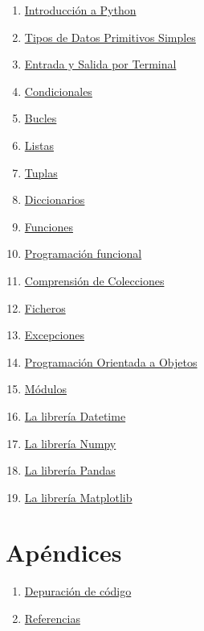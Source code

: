 \documentclass[
  spanish,
  a4paper,
]{scrreport}
\providecommand{\tightlist}{%
  \setlength{\itemsep}{0pt}\setlength{\parskip}{0pt}}
\begin{document}

\begin{enumerate}
\def\labelenumi{\arabic{enumi}.}
\tightlist
\item
  \href{01-introduccion-python.qmd}{Introducción a Python}
\item
  \href{02-tipos-datos-simples.qmd}{Tipos de Datos Primitivos Simples}
\item
  \href{03-entrada-salida.qmd}{Entrada y Salida por Terminal}
\item
  \href{04-condicionales.qmd}{Condicionales}
\item
  \href{05-bucles.qmd}{Bucles}
\item
  \href{06-listas.qmd}{Listas}
\item
  \href{07-tuplas.qmd}{Tuplas}
\item
  \href{08-diccionarios.qmd}{Diccionarios}
\item
  \href{09-funciones.qmd}{Funciones}
\item
  \href{10-programacion-funcional.qmd}{Programación funcional}
\item
  \href{11-comprension-colecciones.qmd}{Comprensión de Colecciones}
\item
  \href{12-ficheros.qmd}{Ficheros}
\item
  \href{13-excepciones.qmd}{Excepciones}
\item
  \href{14-objetos.qmd}{Programación Orientada a Objetos}
\item
  \href{15-modulos.qmd}{Módulos}
\item
  \href{16-datetime.qmd}{La librería Datetime}
\item
  \href{17-numpy.qmd}{La librería Numpy}
\item
  \href{18-pandas.qmd}{La librería Pandas}
\item
  \href{19-matplotlib.qmd}{La librería Matplotlib}
\end{enumerate}

\section*{Apéndices}\label{apuxe9ndices}


\begin{enumerate}
\def\labelenumi{\arabic{enumi}.}
\setcounter{enumi}{19}
\tightlist
\item
  \href{20-depuracion.qmd}{Depuración de código}
\item
  \href{21-referencias.qmd}{Referencias}
\end{enumerate}
\end{document}
